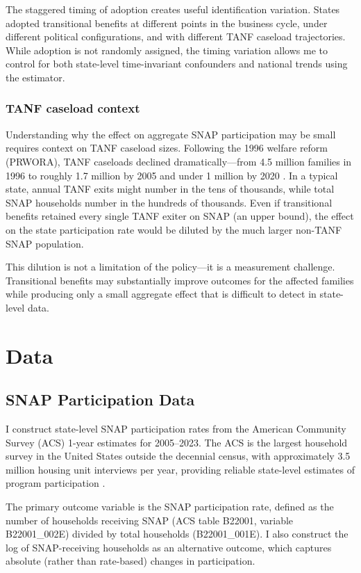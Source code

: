 \documentclass[12pt]{article}
\begin{document}
The staggered timing of adoption creates useful identification variation. States adopted transitional benefits at different points in the business cycle, under different political configurations, and with different TANF caseload trajectories. While adoption is not randomly assigned, the timing variation allows me to control for both state-level time-invariant confounders and national trends using the \citet{callaway2021difference} estimator.

\subsubsection*{TANF caseload context} Understanding why the effect on aggregate SNAP participation may be small requires context on TANF caseload sizes. Following the 1996 welfare reform (PRWORA), TANF caseloads declined dramatically---from 4.5 million families in 1996 to roughly 1.7 million by 2005 and under 1 million by 2020 \citep{falk2022tanf}. In a typical state, annual TANF exits might number in the tens of thousands, while total SNAP households number in the hundreds of thousands. Even if transitional benefits retained every single TANF exiter on SNAP (an upper bound), the effect on the state participation rate would be diluted by the much larger non-TANF SNAP population.

This dilution is not a limitation of the policy---it is a measurement challenge. Transitional benefits may substantially improve outcomes for the affected families while producing only a small aggregate effect that is difficult to detect in state-level data.


\section{Data}

\subsection{SNAP Participation Data}

I construct state-level SNAP participation rates from the American Community Survey (ACS) 1-year estimates for 2005--2023. The ACS is the largest household survey in the United States outside the decennial census, with approximately 3.5 million housing unit interviews per year, providing reliable state-level estimates of program participation \citep{census2023acs}.

The primary outcome variable is the SNAP participation rate, defined as the number of households receiving SNAP (ACS table B22001, variable B22001\_002E) divided by total households (B22001\_001E). I also construct the log of SNAP-receiving households as an alternative outcome, which captures absolute (rather than rate-based) changes in participation.
\end{document}
